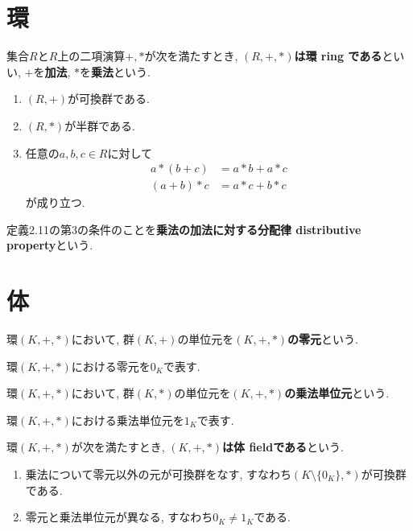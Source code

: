 \section{環}
\begin{Def}
集合$R$と$R$上の二項演算$+,*$が次を満たすとき, {\bf $(R,+,*)$は環 ring である}といい, $+$を{\bf 加法}, $*$を{\bf 乗法}という. 
\begin{enumerate}
\item $(R,+)$が可換群である.
\item $(R,*)$が半群である.
\item 任意の$a,b,c\in R$に対して
\begin{align*}
a*(b+c)&=a*b+a*c\\
(a+b)*c&=a*c+b*c
\end{align*}
が成り立つ.
\end{enumerate}
\end{Def}

定義2.11の第3の条件のことを{\bf 乗法の加法に対する分配律 distributive property}という.

\section{体}
\begin{Def}
環$(K,+,*)$において,
群$(K,+)$の単位元を{\bf $(K,+,*)$の零元}という.
\end{Def}
\begin{Notation}
環$(K,+,*)$における零元を$0_K$で表す.
\end{Notation}
\begin{Def}
環$(K,+,*)$において,
群$(K,*)$の単位元を{\bf $(K,+,*)$の乗法単位元}という.
\end{Def}
\begin{Notation}
環$(K,+,*)$における乗法単位元を$1_K$で表す.
\end{Notation}

\begin{Def}
環$(K,+,*)$が次を満たすとき, {\bf $(K,+,*)$は体 fieldである}という.
\begin{enumerate}
\item 乗法について零元以外の元が可換群をなす, すなわち$(K\setminus\{0_K\},*)$が可換群である.
\item 零元と乗法単位元が異なる, すなわち$0_K\neq 1_K$である.
\end{enumerate}
\end{Def}